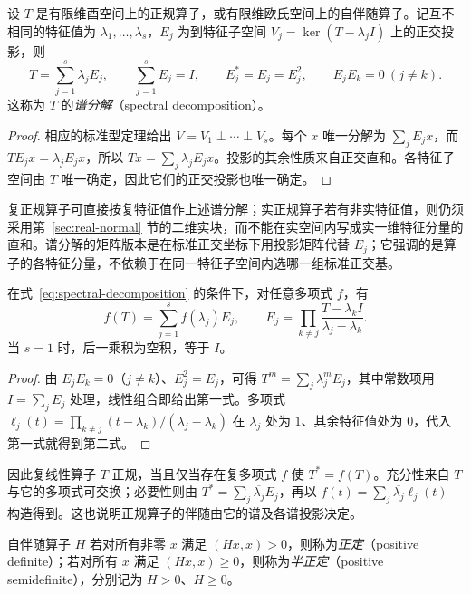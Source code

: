 \begin{theorem}[谱分解]
\label{thm:spectral-decomposition}
设 $T$ 是有限维酉空间上的正规算子，或有限维欧氏空间上的自伴随算子。记互不相同的特征值为 $\lambda_1,\ldots,\lambda_s$，$E_j$ 为到特征子空间 $V_j=\ker(T-\lambda_jI)$ 上的正交投影，则
\begin{equation}
\label{eq:spectral-decomposition}
    T=\sum_{j=1}^s\lambda_jE_j,\qquad
    \sum_{j=1}^sE_j=I,\qquad
    E_j^*=E_j=E_j^2,\qquad E_jE_k=0\ (j\ne k).
\end{equation}
这称为 $T$ 的\emph{谱分解}（spectral decomposition）。
\end{theorem}
\begin{proof}
相应的标准型定理给出 $V=V_1\mathbin\perp\cdots\mathbin\perp V_s$。每个 $x$ 唯一分解为 $\sum_jE_jx$，而 $TE_jx=\lambda_jE_jx$，所以 $Tx=\sum_j\lambda_jE_jx$。投影的其余性质来自正交直和。各特征子空间由 $T$ 唯一确定，因此它们的正交投影也唯一确定。
\end{proof}

复正规算子可直接按复特征值作上述谱分解；实正规算子若有非实特征值，则仍须采用第~\ref{sec:real-normal} 节的二维实块，而不能在实空间内写成实一维特征分量的直和。谱分解的矩阵版本是在标准正交坐标下用投影矩阵代替 $E_j$；它强调的是算子的各特征分量，不依赖于在同一特征子空间内选哪一组标准正交基。

\begin{proposition}
\label{prop:spectral-polynomial}
在式~\eqref{eq:spectral-decomposition} 的条件下，对任意多项式 $f$，有
\begin{equation}
\label{eq:spectral-polynomial}
    f(T)=\sum_{j=1}^s f(\lambda_j)E_j,\qquad
    E_j=\prod_{k\ne j}\frac{T-\lambda_kI}{\lambda_j-\lambda_k}.
\end{equation}
当 $s=1$ 时，后一乘积为空积，等于 $I$。
\end{proposition}
\begin{proof}
由 $E_jE_k=0$（$j\ne k$）、$E_j^2=E_j$，可得 $T^m=\sum_j\lambda_j^mE_j$，其中常数项用 $I=\sum_jE_j$ 处理，线性组合即给出第一式。多项式 $\ell_j(t)=\prod_{k\ne j}(t-\lambda_k)/(\lambda_j-\lambda_k)$ 在 $\lambda_j$ 处为 $1$、其余特征值处为 $0$，代入第一式就得到第二式。
\end{proof}

因此复线性算子 $T$ 正规，当且仅当存在复多项式 $f$ 使 $T^*=f(T)$。充分性来自 $T$ 与它的多项式可交换；必要性则由 $T^*=\sum_j\overline{\lambda_j}E_j$，再以 $f(t)=\sum_j\overline{\lambda_j}\ell_j(t)$ 构造得到。这也说明正规算子的伴随由它的谱及各谱投影决定。

\begin{definition}
自伴随算子 $H$ 若对所有非零 $x$ 满足 $(Hx,x)>0$，则称为\emph{正定}（positive definite）；若对所有 $x$ 满足 $(Hx,x)\geq0$，则称为\emph{半正定}（positive semidefinite），分别记为 $H>0$、$H\geq0$。
\end{definition}

